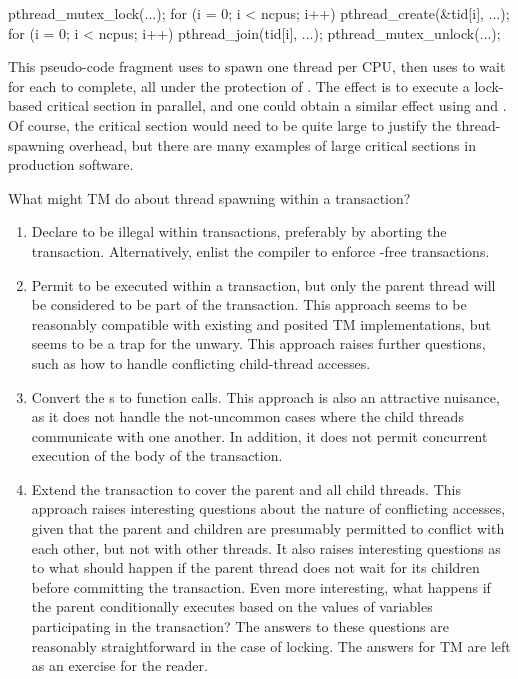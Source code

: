 \begin{VerbatimN}
pthread_mutex_lock(...);
for (i = 0; i < ncpus; i++)
	pthread_create(&tid[i], ...);
for (i = 0; i < ncpus; i++)
	pthread_join(tid[i], ...);
pthread_mutex_unlock(...);
\end{VerbatimN}

This pseudo-code fragment uses  to spawn one thread
per CPU, then uses  to wait for each to complete,
all under the protection of .
The effect is to execute a lock-based critical section in parallel,
and one could obtain a similar effect using  and .
Of course, the critical section would need to be quite large to justify
the thread-spawning overhead, but there are many examples of large
critical sections in production software.

What might TM do about thread spawning within a transaction?

\begin{enumerate}
\item	Declare  to be illegal within transactions,
	preferably by aborting the transaction.
	Alternatively, enlist the compiler to enforce
	-free transactions.
\item	Permit  to be executed within a
	transaction, but only the parent thread will be considered to
	be part of the transaction.
	This approach seems to be reasonably compatible with existing and
	posited TM implementations, but seems to be a trap for the unwary.
	This approach raises further questions, such as how to handle
	conflicting child-thread accesses.
\item	Convert the s to function calls.
	This approach is also an attractive nuisance, as it does not
	handle the not-uncommon cases where the child threads communicate
	with one another.
	In addition, it does not permit concurrent execution of the body
	of the transaction.
\item	Extend the transaction to cover the parent and all child threads.
	This approach raises interesting questions about the nature of
	conflicting accesses, given that the parent and children are
	presumably permitted to conflict with each other, but not with
	other threads.
	It also raises interesting questions as to what should happen
	if the parent thread does not wait for its children before
	committing the transaction.
	Even more interesting, what happens if the parent conditionally
	executes  based on the values of variables
	participating in the transaction?
	The answers to these questions are reasonably straightforward
	in the case of locking.
	The answers for TM are left as an exercise for the reader.
\end{enumerate}


